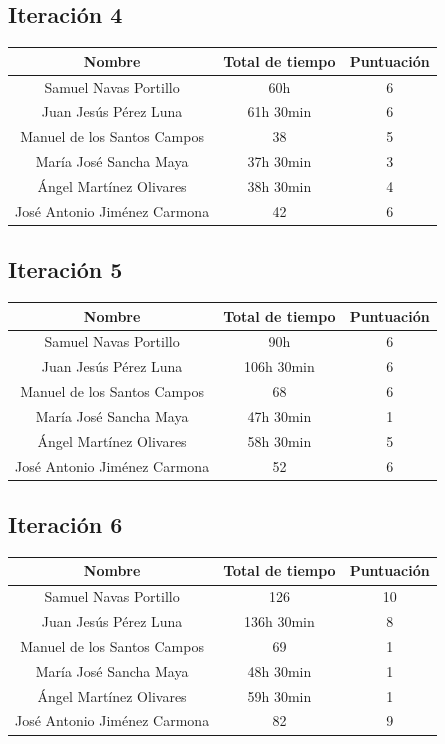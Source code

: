 \documentclass[11 pt]{book}
\begin{document}
		\subsection*{Iteración 4}			
			\begin{tabular}{|c|c|c|}
				\hline
				Nombre & Total de tiempo & Puntuación\\
				\hline
				Samuel Navas Portillo & 60h & 6\\
				Juan Jesús Pérez Luna & 61h 30min & 6\\
				Manuel de los Santos Campos & 38 & 5\\
				María José Sancha Maya & 37h 30min & 3\\
				Ángel Martínez Olivares & 38h 30min & 4\\
				José Antonio Jiménez Carmona & 42 & 6\\
				\hline
			\end{tabular}
			
		\subsection*{Iteración 5}			
			\begin{tabular}{|c|c|c|}
				\hline
				Nombre & Total de tiempo & Puntuación\\
				\hline
				Samuel Navas Portillo & 90h & 6\\
				Juan Jesús Pérez Luna & 106h 30min & 6\\
				Manuel de los Santos Campos & 68 & 6\\
				María José Sancha Maya & 47h 30min & 1\\
				Ángel Martínez Olivares & 58h 30min & 5\\
				José Antonio Jiménez Carmona & 52 & 6\\
				\hline
			\end{tabular}
			
		\subsection*{Iteración 6}			
			\begin{tabular}{|c|c|c|}
				\hline
				Nombre & Total de tiempo & Puntuación\\
				\hline
				Samuel Navas Portillo & 126 & 10\\
				Juan Jesús Pérez Luna & 136h 30min & 8\\
				Manuel de los Santos Campos & 69 & 1\\
				María José Sancha Maya & 48h 30min & 1\\
				Ángel Martínez Olivares & 59h 30min & 1\\
				José Antonio Jiménez Carmona & 82 & 9\\
				\hline
			\end{tabular}
			
\end{document}
